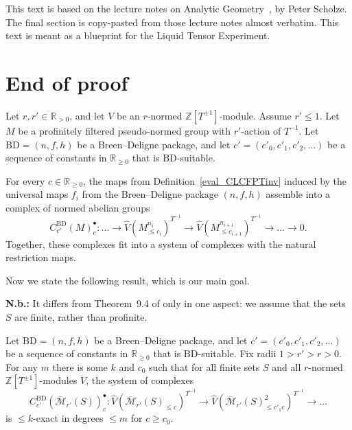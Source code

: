 \maketitle

\begin{remark}
	This text is based on the lecture notes on Analytic Geometry~\cite{Analytic},
	by Peter Scholze.
  The final section is copy-pasted from those lecture notes almost verbatim.
  This text is meant as a blueprint for the Liquid Tensor Experiment.
\end{remark}








\section{End of proof}

\begin{definition}
  \label{BD_system}
  \leanok
  Let $r, r' \in \mathbb R_{>0}$,
  and let $V$ be an $r$-normed $\mathbb Z[T^{\pm 1}]$-module.
  Assume $r' \le 1$.
  Let $M$ be a profinitely filtered pseudo-normed group with $r'$-action of $T^{-1}$.
  Let $\text{BD} = (n,f,h)$ be a Breen--Deligne package,
  and let $c' = (c'_0, c'_1, c'_2, \dots)$ be a sequence of constants in $\mathbb R_{\ge 0}$
  that is $\text{BD}$-suitable.

  For every $c \in \mathbb R_{\ge 0}$,
  the maps from Definition~\ref{eval_CLCFPTinv}
  induced by the universal maps $f_i$ from the Breen--Deligne package $(n,f,h)$
  assemble into a complex of normed abelian groups
  \[
    C^{\text{BD}}_{c'}(M)_c^\bullet \colon
    \dots \to
    \hat V(M_{\le c_i}^{n_i})^{T^{-1}}
    \to
    \hat V(M_{\le c_{i+1}}^{n_{i+1}})^{T^{-1}}
    \to \dots \to 0.
  \]
  Together, these complexes fit into a system of complexes
  with the natural restriction maps.
\end{definition}

Now we state the following result, which is our main goal.

\textbf{N.b.:}
It differs from Theorem~9.4 of \cite{Analytic} only in one aspect:
we assume that the sets $S$ are finite, rather than profinite.

\begin{theorem}
  \label{first_target}
  \leanok
  Let $\text{BD} = (n,f,h)$ be a Breen--Deligne package,
  and let $c' = (c'_0, c'_1, c'_2, \dots)$ be a sequence of constants in $\mathbb R_{\ge 0}$
  that is $\text{BD}$-suitable.
	Fix radii $1>r'>r>0$.
  For any $m$ there is some $k$ and $c_0$ such that for all finite sets $S$ and all $r$-normed $\mathbb Z[T^{\pm 1}]$-modules $V$,
  the system of complexes
  \[
    C^{\text{BD}}_{c'}(\overline{\mathcal M}_{r'}(S))_c^\bullet \colon
    \widehat{V}(\overline{\mathcal M}_{r'}(S)_{\leq c})^{T^{-1}} \to
    \widehat{V}(\overline{\mathcal M}_{r'}(S)_{\leq c'_1c}^2)^{T^{-1}}
    \to \ldots
  \]
  is $\leq k$-exact in degrees $\leq m$ for $c\geq c_0$.
\end{theorem}

